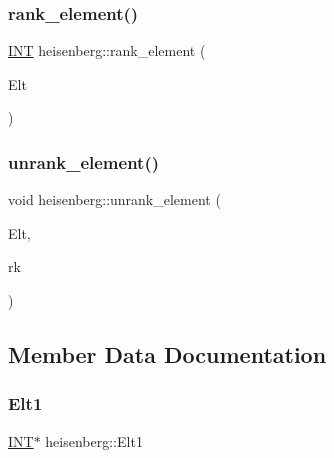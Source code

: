 \mbox{\label{classheisenberg_a972b9c211fb4093a381a8b2a0dee30bd}} 
\subsubsection{\texorpdfstring{rank\+\_\+element()}{rank\_element()}}
{\footnotesize\ttfamily \mbox{\hyperlink{galois_8h_a09fddde158a3a20bd2dcadb609de11dc}{I\+NT}} heisenberg\+::rank\+\_\+element (\begin{DoxyParamCaption}\item[{\mbox{\hyperlink{galois_8h_a09fddde158a3a20bd2dcadb609de11dc}{I\+NT}} $\ast$}]{Elt }\end{DoxyParamCaption})}

\mbox{\label{classheisenberg_a45f9de07eb289caa5497e052fa74b994}} 
\subsubsection{\texorpdfstring{unrank\+\_\+element()}{unrank\_element()}}
{\footnotesize\ttfamily void heisenberg\+::unrank\+\_\+element (\begin{DoxyParamCaption}\item[{\mbox{\hyperlink{galois_8h_a09fddde158a3a20bd2dcadb609de11dc}{I\+NT}} $\ast$}]{Elt,  }\item[{\mbox{\hyperlink{galois_8h_a09fddde158a3a20bd2dcadb609de11dc}{I\+NT}}}]{rk }\end{DoxyParamCaption})}



\subsection{Member Data Documentation}
\mbox{\label{classheisenberg_a6020d937f6761e6c392fe4f3c4b65755}} 
\subsubsection{\texorpdfstring{Elt1}{Elt1}}
{\footnotesize\ttfamily \mbox{\hyperlink{galois_8h_a09fddde158a3a20bd2dcadb609de11dc}{I\+NT}}$\ast$ heisenberg\+::\+Elt1}


